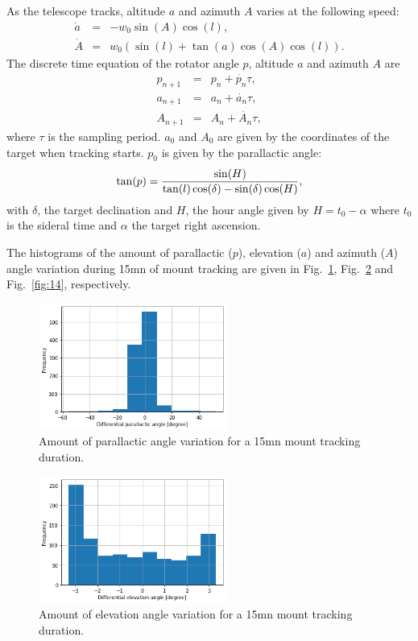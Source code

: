 \documentclass{gmto}
\begin{document}
As the telescope tracks, altitude $a$ and azimuth $A$ varies at the following speed:
\begin{eqnarray}
  \label{eq:10}
  \dot{a} &=& -w_0\sin(A)\cos(l),\\
  \dot{A} &=& w_0(\sin(l)+\tan(a)\cos(A)\cos(l)).
\end{eqnarray}
The discrete time equation of the rotator angle $p$, altitude $a$ and azimuth $A$ are
\begin{eqnarray}
  \label{eq:11}
  p_{n+1} &=& p_n + \dot{p_n}\tau,\\
  a_{n+1} &=& a_n + \dot{a_n}\tau,\\
  A_{n+1} &=& A_n + \dot{A_n}\tau,
\end{eqnarray}
where $\tau$ is the sampling period.
$a_0$ and $A_0$ are given by the coordinates of the target when tracking starts.
$p_0$ is given by the parallactic angle:
\begin{eqnarray}
  \label{eq:12}
  \tan(p) = {\sin(H)\over \tan(l)\cos(\delta) - \sin(\delta)\cos(H)},
\end{eqnarray}
with $\delta$, the target declination and $H$, the hour angle given by
$H=t_0-\alpha$ where $t_0$ is the sideral time and $\alpha$ the target right
ascension.

The histograms of the amount of parallactic ($p$), elevation ($a$) and azimuth ($A$) angle
variation during 15mn of mount tracking are given in Fig.~\ref{fig:12},
Fig.~\ref{fig:13} and Fig.~\ref{fig:14}, respectively.

\begin{figure}
  \centering
  \includegraphics[width=0.55\textwidth]{diff_p_angle.png}
  \caption{Amount of parallactic angle variation for a 15mn mount tracking
    duration.}
  \label{fig:12}
\end{figure}

\begin{figure}
  \centering
  \includegraphics[width=0.55\textwidth]{diff_el_angle.png}
  \caption{Amount of elevation angle variation for a 15mn mount tracking
    duration.}
  \label{fig:13}
\end{figure}
\end{document}
